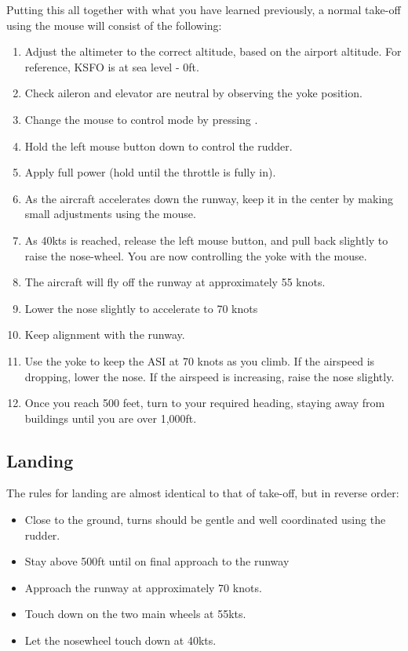 \begin{itemize}
Putting this all together with what you have learned previously, a normal
take-off using the mouse will consist of the following:

\begin{enumerate}
  \item Adjust the altimeter to the correct altitude, based on the airport
  altitude. For reference, KSFO is at sea level - 0ft.
    \item Check aileron and elevator are neutral by observing the yoke position.
  \item Change the mouse to control mode by pressing .
  \item Hold the left mouse button down to control the rudder.
  \item Apply full power (hold  until the throttle is fully in).
  \item As the aircraft accelerates down the runway, keep it in the center by
  making small adjustments using the mouse.
  \item As 40kts is reached, release the left mouse button, and pull back
  slightly to raise the nose-wheel. You are now controlling the yoke with the
  mouse.
  \item The aircraft will fly off the runway at approximately 55 knots.
  \item Lower the nose slightly to accelerate to 70 knots
  \item Keep alignment with the runway.
  \item Use the yoke to keep the ASI at 70 knots as you climb. If the airspeed
  is dropping, lower the nose. If the airspeed is increasing, raise the nose
  slightly.
  \item Once you reach 500 feet, turn to your required heading, staying away from
  buildings until you are over 1,000ft.
\end{enumerate}

\subsection{Landing}
\label{sec:Ladowanie}

The rules for landing are almost identical to that of take-off, but in reverse
order:
\begin{itemize}
    \item Close to the ground, turns should be gentle and well coordinated
  using the rudder.
  \item Stay above 500ft until on final approach to the runway
    \item Approach the runway at approximately 70 knots.
    \item Touch down on the two main wheels at 55kts.
  \item Let the nosewheel touch down at 40kts.
\end{itemize}


\end{itemize}
